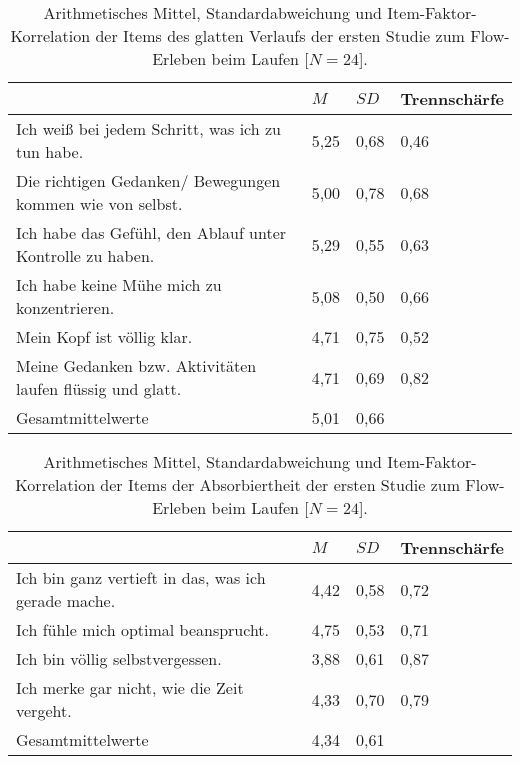 \begin{table}
	[!htb] \centering \caption[Item-Faktor-Korrelation der Items des glatten Verlaufs (Erste Studie: Laufen)]{Arithmetisches Mittel, Standardabweichung und Item-Faktor-Korrelation der Items des glatten Verlaufs der ersten Studie zum Flow-Erleben beim Laufen [$N = 24$].} \label{tab:glatter_verlauf_1} 
	\begin{tabularx}
		{ 
		\textwidth}{p{} p{} p{} p{}} \toprule & $M$ & $SD$ & Trennschärfe \\
		\midrule Ich weiß bei jedem Schritt, was ich zu tun habe. & 5,25 & 0,68 & 0,46 \\
		Die richtigen Gedanken/ Bewegungen kommen wie von selbst. & 5,00 & 0,78 & 0,68 \\
		Ich habe das Gefühl, den Ablauf unter Kontrolle zu haben. & 5,29 & 0,55 & 0,63 \\
		Ich habe keine Mühe mich zu konzentrieren. & 5,08 & 0,50 & 0,66 \\
		Mein Kopf ist völlig klar. & 4,71 & 0,75 & 0,52 \\
		Meine Gedanken bzw. Aktivitäten laufen flüssig und glatt. & 4,71 & 0,69 & 0,82 \\
		Gesamtmittelwerte & 5,01 & 0,66 & \\
		\bottomrule 
	\end{tabularx}
\end{table}
\begin{table}
	[!htb] \centering \caption[Item-Faktor-Korrelation der Items der Absorbiertheit (Erste Studie: Laufen)]{Arithmetisches Mittel, Standardabweichung und Item-Faktor-Korrelation der Items der Absorbiertheit der ersten Studie zum Flow-Erleben beim Laufen [$N = 24$].} \label{tab:absorbiertheit_1} 
	\begin{tabularx}
		{ 
		\textwidth}{p{} p{} p{} p{}} \toprule & $M$ & $SD$ & Trennschärfe \\
		\midrule Ich bin ganz vertieft in das, was ich gerade mache. & 4,42 & 0,58 & 0,72 \\
		Ich fühle mich optimal beansprucht. & 4,75 & 0,53 & 0,71 \\
		Ich bin völlig selbstvergessen. & 3,88 & 0,61 & 0,87 \\
		Ich merke gar nicht, wie die Zeit vergeht. & 4,33 & 0,70 & 0,79 \\
		Gesamtmittelwerte & 4,34 & 0,61 & \\
		\bottomrule 
	\end{tabularx}
\end{table}

